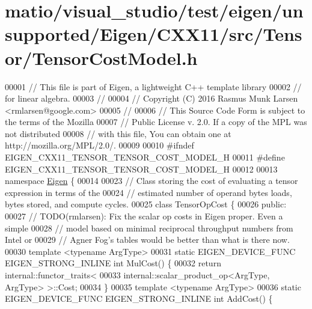 \hypertarget{matio_2visual__studio_2test_2eigen_2unsupported_2_eigen_2_c_x_x11_2src_2_tensor_2_tensor_cost_model_8h_source}{}\section{matio/visual\+\_\+studio/test/eigen/unsupported/\+Eigen/\+C\+X\+X11/src/\+Tensor/\+Tensor\+Cost\+Model.h}
\label{matio_2visual__studio_2test_2eigen_2unsupported_2_eigen_2_c_x_x11_2src_2_tensor_2_tensor_cost_model_8h_source}

\begin{DoxyCode}
00001 \textcolor{comment}{// This file is part of Eigen, a lightweight C++ template library}
00002 \textcolor{comment}{// for linear algebra.}
00003 \textcolor{comment}{//}
00004 \textcolor{comment}{// Copyright (C) 2016 Rasmus Munk Larsen <rmlarsen@google.com>}
00005 \textcolor{comment}{//}
00006 \textcolor{comment}{// This Source Code Form is subject to the terms of the Mozilla}
00007 \textcolor{comment}{// Public License v. 2.0. If a copy of the MPL was not distributed}
00008 \textcolor{comment}{// with this file, You can obtain one at http://mozilla.org/MPL/2.0/.}
00009 
00010 \textcolor{preprocessor}{#ifndef EIGEN\_CXX11\_TENSOR\_TENSOR\_COST\_MODEL\_H}
00011 \textcolor{preprocessor}{#define EIGEN\_CXX11\_TENSOR\_TENSOR\_COST\_MODEL\_H}
00012 
00013 \textcolor{keyword}{namespace }\hyperlink{namespace_eigen}{Eigen} \{
00014 
00023 \textcolor{comment}{// Class storing the cost of evaluating a tensor expression in terms of the}
00024 \textcolor{comment}{// estimated number of operand bytes loads, bytes stored, and compute cycles.}
00025 \textcolor{keyword}{class }TensorOpCost \{
00026  \textcolor{keyword}{public}:
00027   \textcolor{comment}{// TODO(rmlarsen): Fix the scalar op costs in Eigen proper. Even a simple}
00028   \textcolor{comment}{// model based on minimal reciprocal throughput numbers from Intel or}
00029   \textcolor{comment}{// Agner Fog's tables would be better than what is there now.}
00030   \textcolor{keyword}{template} <\textcolor{keyword}{typename} ArgType>
00031   \textcolor{keyword}{static} EIGEN\_DEVICE\_FUNC EIGEN\_STRONG\_INLINE \textcolor{keywordtype}{int} MulCost() \{
00032     \textcolor{keywordflow}{return} internal::functor\_traits<
00033         internal::scalar\_product\_op<ArgType, ArgType> >::Cost;
00034   \}
00035   \textcolor{keyword}{template} <\textcolor{keyword}{typename} ArgType>
00036   \textcolor{keyword}{static} EIGEN\_DEVICE\_FUNC EIGEN\_STRONG\_INLINE \textcolor{keywordtype}{int} AddCost() \{

\end{DoxyCode}
